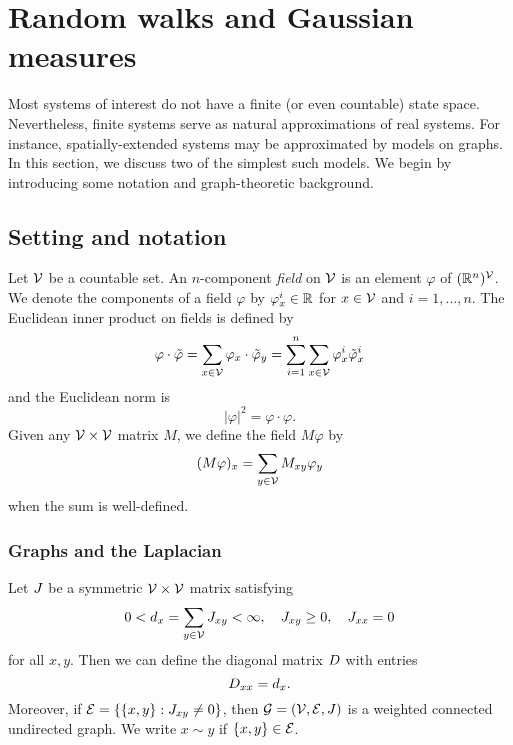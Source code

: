 
\section{Random walks and Gaussian measures}

Most systems of interest do not have a finite (or even countable) state space. Nevertheless,
finite systems serve as natural approximations of real systems. For instance, spatially-extended
systems may be approximated by models on graphs. In this section, we discuss two of the
simplest such models. We begin by introducing some notation and graph-theoretic background.


\subsection{Setting and notation}

Let $\mathcal{V}$ be a countable set. An $n$-component \emph{field} on $\mathcal{V}$
is an element $\varphi$ of $({\mathbb R}^n)^{\mathcal{V}}$.
We denote the components of a field $\varphi$
by $\varphi^i_x \in {\mathbb R}$ for $x \in \mathcal{V}$ and $i = 1, \ldots, n$.
The Euclidean inner product on fields is defined by
\begin{equation}
\varphi\cdot\tilde\varphi
  =
\sum_{x\in\mathcal{V}} \varphi_x \cdot \tilde\varphi_y
  =
\sum_{i=1}^n \sum_{x\in\mathcal{V}} \varphi^i_x \tilde\varphi^i_x
\end{equation}
and the Euclidean norm is
\begin{equation}
|\varphi|^2 = \varphi \cdot \varphi.
\end{equation}
Given any $\mathcal{V}\times\mathcal{V}$ matrix $M$, we define the field $M \varphi$ by
\begin{equation}
(M \varphi)_x = \sum_{y\in\mathcal{V}} M_{xy} \varphi_y
\end{equation}
when the sum is well-defined.

\subsubsection{Graphs and the Laplacian}

Let $J$ be a symmetric $\mathcal{V}\times\mathcal{V}$ matrix satisfying
\begin{equation}
0 < d_x = \sum_{y\in\mathcal{V}} J_{xy} < \infty,
  \quad
J_{xy} \ge 0,
  \quad
J_{xx} = 0
\end{equation}
for all $x, y$. Then we can define the diagonal matrix $D$ with entries
\begin{equation}
D_{xx} = d_x.
\end{equation}
Moreover, if $\mathcal{E} = \{ \{ x, y \} : J_{xy} \ne 0 \}$, then
$\mathcal{G} = (\mathcal{V}, \mathcal{E}, J)$ is a weighted connected undirected graph.
We write $x \sim y$ if $\{ x, y \} \in \mathcal{E}$.

